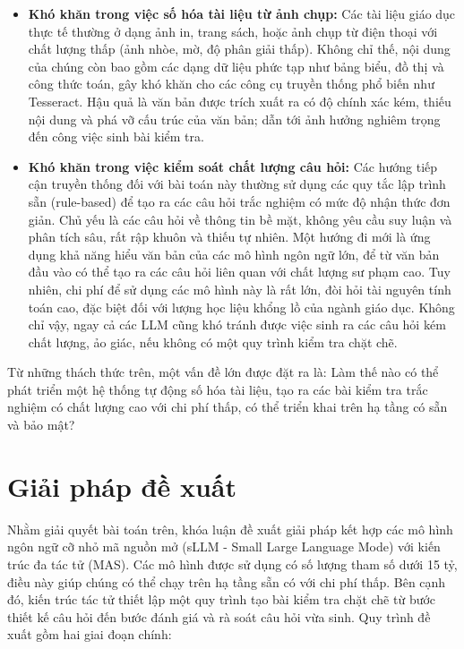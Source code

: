 \begin{itemize}
\item \textbf{Khó khăn trong việc số hóa tài liệu từ ảnh chụp:} Các tài liệu giáo dục thực tế thường ở dạng ảnh in, trang sách, hoặc ảnh chụp từ điện thoại với chất lượng thấp (ảnh nhòe, mờ, độ phân giải thấp). Không chỉ thế, nội dung của chúng còn bao gồm các dạng dữ liệu phức tạp như bảng biểu, đồ thị và công thức toán, gây khó khăn cho các công cụ truyền thống phổ biến như Tesseract. Hậu quả là văn bản được trích xuất ra có độ chính xác kém, thiếu nội dung và phá vỡ cấu trúc của văn bản; dẫn tới ảnh hưởng nghiêm trọng đến công việc sinh bài kiểm tra.


\item \textbf{Khó khăn trong việc kiểm soát chất lượng câu hỏi:} Các hướng tiếp cận truyền thống đối với bài toán này thường sử dụng các quy tắc lập trình sẵn (rule-based) để tạo ra các câu hỏi trắc nghiệm có mức độ nhận thức đơn giản. Chủ yếu là các câu hỏi về thông tin bề mặt, không yêu cầu suy luận và phân tích sâu, rất rập khuôn và thiếu tự nhiên. Một hướng đi mới là ứng dụng khả năng hiểu văn bản của các mô hình ngôn ngữ lớn, để từ văn bản đầu vào có thể tạo ra các câu hỏi liên quan với chất lượng sư phạm cao. Tuy nhiên, chi phí để sử dụng các mô hình này là rất lớn, đòi hỏi tài nguyên tính toán cao, đặc biệt đối với lượng học liệu khổng lồ của ngành giáo dục. Không chỉ vậy, ngay cả các LLM cũng khó tránh được việc sinh ra các câu hỏi kém chất lượng, ảo giác, nếu không có một quy trình kiểm tra chặt chẽ.

\end{itemize}

Từ những thách thức trên, một vấn đề lớn được đặt ra là: Làm thế nào có thể phát triển một hệ thống tự động số hóa tài liệu, tạo ra các bài kiểm tra trắc nghiệm có chất lượng cao với chi phí thấp, có thể triển khai trên hạ tầng có sẵn và bảo mật?

\section{Giải pháp đề xuất}

Nhằm giải quyết bài toán trên, khóa luận đề xuất giải pháp kết hợp các mô hình ngôn ngữ cỡ nhỏ mã nguồn mở (sLLM - Small Large Language Mode) với kiến trúc đa tác tử (MAS). Các mô hình được sử dụng có số lượng tham số dưới 15 tỷ, điều này giúp chúng có thể chạy trên hạ tầng sẵn có với chi phí thấp. Bên cạnh đó, kiến trúc tác tử thiết lập một quy trình tạo bài kiểm tra chặt chẽ từ bước thiết kế câu hỏi đến bước đánh giá và rà soát câu hỏi vừa sinh. Quy trình đề xuất gồm hai giai đoạn chính:

